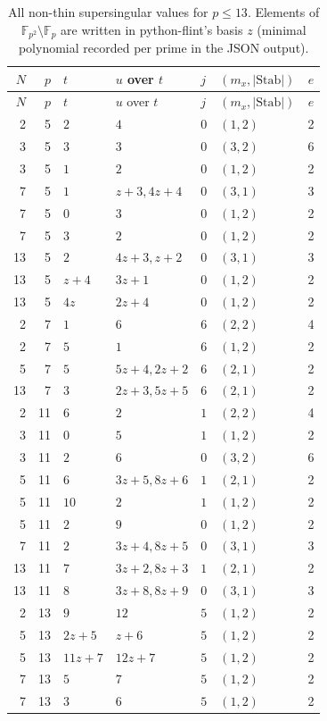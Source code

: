 \documentclass[11pt,a4paper]{article}
\numberwithin{equation}{section}
\theoremstyle{definition}
\theoremstyle{remark}
\begin{document}
{\small
\begin{longtable}{rrllllr}
\caption{All non-thin supersingular values for $p\le13$. Elements of $\mathbb F_{p^2}\setminus\mathbb F_p$ are written in python-flint's basis $z$ (minimal polynomial recorded per prime in the JSON output).}\label{tab:nonthin}\\
\toprule
$N$ & $p$ & $t$ & $u$ over $t$ & $j$ & $(m_x,|\mathrm{Stab}|)$ & $e$\\
\midrule
\endfirsthead
\toprule
$N$ & $p$ & $t$ & $u$ over $t$ & $j$ & $(m_x,|\mathrm{Stab}|)$ & $e$\\
\midrule
\endhead
2 & 5 & $2$ & $4$ & $0$ & $(1,2)$ & 2\\
3 & 5 & $3$ & $3$ & $0$ & $(3,2)$ & 6\\
3 & 5 & $1$ & $2$ & $0$ & $(1,2)$ & 2\\
7 & 5 & $1$ & $z + 3, 4z + 4$ & $0$ & $(3,1)$ & 3\\
7 & 5 & $0$ & $3$ & $0$ & $(1,2)$ & 2\\
7 & 5 & $3$ & $2$ & $0$ & $(1,2)$ & 2\\
13 & 5 & $2$ & $4z + 3, z + 2$ & $0$ & $(3,1)$ & 3\\
13 & 5 & $z + 4$ & $3z + 1$ & $0$ & $(1,2)$ & 2\\
13 & 5 & $4z$ & $2z + 4$ & $0$ & $(1,2)$ & 2\\
2 & 7 & $1$ & $6$ & $6$ & $(2,2)$ & 4\\
2 & 7 & $5$ & $1$ & $6$ & $(1,2)$ & 2\\
5 & 7 & $5$ & $5z + 4, 2z + 2$ & $6$ & $(2,1)$ & 2\\
13 & 7 & $3$ & $2z + 3, 5z + 5$ & $6$ & $(2,1)$ & 2\\
2 & 11 & $6$ & $2$ & $1$ & $(2,2)$ & 4\\
3 & 11 & $0$ & $5$ & $1$ & $(1,2)$ & 2\\
3 & 11 & $2$ & $6$ & $0$ & $(3,2)$ & 6\\
5 & 11 & $6$ & $3z + 5, 8z + 6$ & $1$ & $(2,1)$ & 2\\
5 & 11 & $10$ & $2$ & $1$ & $(1,2)$ & 2\\
5 & 11 & $2$ & $9$ & $0$ & $(1,2)$ & 2\\
7 & 11 & $2$ & $3z + 4, 8z + 5$ & $0$ & $(3,1)$ & 3\\
13 & 11 & $7$ & $3z + 2, 8z + 3$ & $1$ & $(2,1)$ & 2\\
13 & 11 & $8$ & $3z + 8, 8z + 9$ & $0$ & $(3,1)$ & 3\\
2 & 13 & $9$ & $12$ & $5$ & $(1,2)$ & 2\\
5 & 13 & $2z + 5$ & $z + 6$ & $5$ & $(1,2)$ & 2\\
5 & 13 & $11z + 7$ & $12z + 7$ & $5$ & $(1,2)$ & 2\\
7 & 13 & $5$ & $7$ & $5$ & $(1,2)$ & 2\\
7 & 13 & $3$ & $6$ & $5$ & $(1,2)$ & 2\\
\bottomrule
\end{longtable}
}
\end{document}
